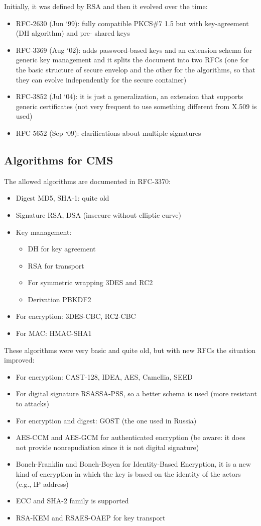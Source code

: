 Initially, it was defined by RSA and then it evolved over the time:
\begin{itemize}
  \item RFC-2630 (Jun ‘99): fully compatible PKCS\#7 1.5 but with
    key-agreement (DH algorithm) and pre- shared keys
  \item RFC-3369 (Aug ‘02): adds password-based keys and an extension
    schema for generic key management and it splits the document into
    two RFCs (one for the basic structure of secure envelop and the
    other for the algorithms, so that they can evolve independently
    for the secure container)
  \item RFC-3852 (Jul ‘04): it is just a generalization, an extension
    that supports generic certificates (not very frequent to use
    something different from X.509 is used)
  \item RFC-5652 (Sep ‘09): clarifications about multiple signatures
\end{itemize}

\subsection{Algorithms for CMS}
The allowed algorithms are documented in RFC-3370:
\begin{itemize}
  \item Digest MD5, SHA-1: quite old
  \item Signature RSA, DSA (insecure without elliptic curve)
  \item Key management:
    \begin{itemize}
      \item DH for key agreement
      \item RSA for transport
      \item For symmetric wrapping 3DES and RC2
      \item Derivation PBKDF2
    \end{itemize}
  \item For encryption: 3DES-CBC, RC2-CBC
  \item For MAC: HMAC-SHA1
\end{itemize}
These algorithms were very basic and quite old, but with new RFCs the
situation improved:
\begin{itemize}
  \item For encryption: CAST-128, IDEA, AES, Camellia, SEED
  \item For digital signature RSASSA-PSS, so a better schema is used
    (more resistant to attacks)
  \item For encryption and digest: GOST (the one used in Russia)
  \item AES-CCM and AES-GCM for authenticated encryption (be aware: it
    does not provide nonrepudiation since it is not digital signature)
  \item Boneh-Franklin and Boneh-Boyen for Identity-Based Encryption,
    it is a new kind of encryption in which the key is based on the
    identity of the actors (e.g., IP address)
  \item ECC and SHA-2 family is supported
  \item RSA-KEM and RSAES-OAEP for key transport
\end{itemize}

